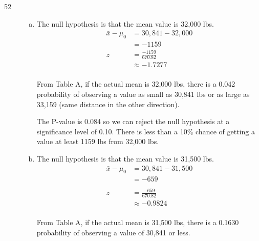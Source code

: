 \documentclass[letterpaper, landscape]{exam}
\begin{document}
\begin{description}
\begin{enumerate}[(a)]
        \end{enumerate}

      \item[52]
        \begin{enumerate}[(a)]
          From exercise 50:
          \begin{align*}
            \bar{x}          & = 30,841 \\
            \sigma_{\bar{x}} & \approx 670.82 \\
          \end{align*}

          \item 
            The null hypothesis is that the mean value is 32,000 lbs.
            \begin{align*}
              \bar{x} - \mu_0 & = 30,841 - 32,000 \\
                              & = -1159 \\
              z & = \frac{-1159}{670.82} \\
                & \approx -1.7277 \\
            \end{align*}

            From Table A, if the actual mean is 32,000 lbs, there is a 0.042
            probability of observing a value as small as 30,841 lbs or as large
            as 33,159 (same distance in the other direction).

            The P-value is 0.084 so we can reject the null hypothesis at a
            significance level of 0.10. There is less than a 10\% chance of
            getting a value at least 1159 lbs from 32,000 lbs.

          \item 
            The null hypothesis is that the mean value is 31,500 lbs.
            \begin{align*}
              \bar{x} - \mu_0 & = 30,841 - 31,500 \\
                              & = -659 \\
              \\
              z  & = \frac{-659}{670.82} \\
                 & \approx -0.9824 \\
            \end{align*}

            From Table A, if the actual mean is 31,500 lbs, there is a 0.1630
            probability of observing a value of 30,841 or less.


\end{enumerate}
\end{description}
\end{document}
